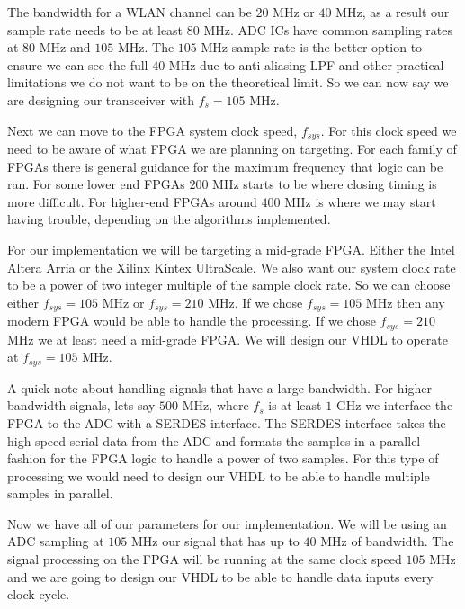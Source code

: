 The bandwidth for a \ac{WLAN} channel can be $20$ \ac{MHz} or $40$ \ac{MHz}, as a result our sample rate needs to be at least $80$ \ac{MHz}. \ac{ADC} \ac{IC}s have common sampling rates at $80$ \ac{MHz} and $105$ \ac{MHz}. The $105$ \ac{MHz} sample rate is the better option to ensure we can see the full $40$ \ac{MHz} due to anti-aliasing \ac{LPF} and other practical limitations we do not want to be on the theoretical limit. So we can now say we are designing our transceiver with $f_s = 105$ \ac{MHz}.

Next we can move to the \ac{FPGA} system clock speed, $f_{sys}$. For this clock speed we need to be aware of what \ac{FPGA} we are planning on targeting. For each family of \ac{FPGA}s there is general guidance for the maximum frequency that logic can be ran. For some lower end \ac{FPGA}s $200$ \ac{MHz} starts to be where closing timing is more difficult. For higher-end \ac{FPGA}s around $400$ \ac{MHz} is where we may start having trouble, depending on the algorithms implemented.

For our implementation we will be targeting a mid-grade \ac{FPGA}. Either the Intel Altera Arria or the Xilinx Kintex UltraScale. We also want our system clock rate to be a power of two integer multiple of the sample clock rate. So we can choose either $f_{sys} = 105$ \ac{MHz} or $f_{sys} = 210$ \ac{MHz}. If we chose $f_{sys} = 105$ \ac{MHz} then any modern \ac{FPGA} would be able to handle the processing. If we chose $f_{sys} = 210$ \ac{MHz} we at least need a mid-grade \ac{FPGA}. We will design our \ac{VHDL} to operate at $f_{sys} = 105$ \ac{MHz}.

A quick note about handling signals that have a large bandwidth. For higher bandwidth signals, lets say $500$ \ac{MHz}, where $f_s$ is at least $1$ \ac{GHz} we interface the \ac{FPGA} to the \ac{ADC} with a \ac{SERDES} interface. The \ac{SERDES} interface takes the high speed serial data from the \ac{ADC} and formats the samples in a parallel fashion for the \ac{FPGA} logic to handle a power of two samples. For this type of processing we would need to design our \ac{VHDL} to be able to handle multiple samples in parallel.

Now we have all of our parameters for our implementation. We will be using an \ac{ADC} sampling at $105$ \ac{MHz} our signal that has up to $40$ \ac{MHz} of bandwidth. The signal processing on the \ac{FPGA} will be running at the same clock speed $105$ \ac{MHz} and we are going to design our \ac{VHDL} to be able to handle data inputs every clock cycle.

